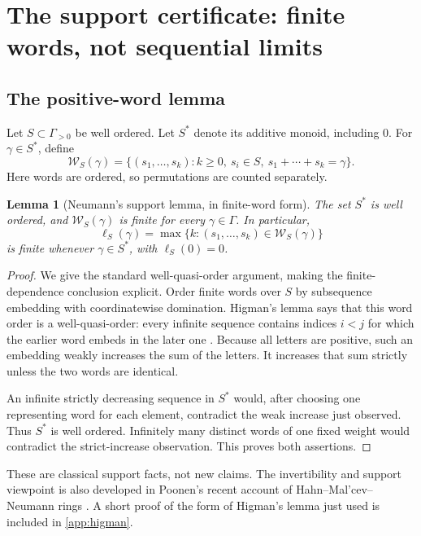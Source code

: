 \documentclass[11pt,letterpaper]{article}
\newtheorem{lemma}[lemma]{Lemma}
\theoremstyle{definition}
\theoremstyle{remark}
\newcommand{\word}{\mathcal W}
\numberwithin{equation}{section}
\begin{document}
\section{The support certificate: finite words, not sequential limits}
\label{sec:support}

\subsection{The positive-word lemma}
Let $S\subset\Gamma_{>0}$ be well ordered. Let $S^*$ denote its additive
monoid, including $0$. For $\gamma\in S^*$, define
\[
 \word_S(\gamma)=
 \{(s_1,\ldots,s_k): k\ge0,\ s_i\in S,\ s_1+\cdots+s_k=\gamma\}.
\]
Here words are ordered, so permutations are counted separately.

\begin{lemma}[Neumann's support lemma, in finite-word form]\label{lem:neumann}
The set $S^*$ is well ordered, and $\word_S(\gamma)$ is finite for every
$\gamma\in\Gamma$. In particular,
\begin{equation}\label{eq:depth}
 \ell_S(\gamma)=\max\{k:(s_1,\ldots,s_k)\in\word_S(\gamma)\}
\end{equation}
is finite whenever $\gamma\in S^*$, with $\ell_S(0)=0$.
\end{lemma}
\begin{proof}
We give the standard well-quasi-order argument, making the finite-dependence
conclusion explicit. Order finite words over $S$ by subsequence embedding
with coordinatewise domination. Higman's lemma says that this word order is
a well-quasi-order: every infinite sequence contains indices $i<j$ for which
the earlier word embeds in the later one \cite{Higman}. Because all letters
are positive, such an embedding weakly increases the sum of the letters.
It increases that sum strictly unless the two words are identical.

An infinite strictly decreasing sequence in $S^*$ would, after choosing one
representing word for each element, contradict the weak increase just
observed. Thus $S^*$ is well ordered. Infinitely many distinct words of one
fixed weight would contradict the strict-increase observation. This proves
both assertions.
\end{proof}
These are classical support facts, not new claims. The invertibility and
support viewpoint is also developed in Poonen's recent account of
Hahn--Mal'cev--Neumann rings \cite{Poonen}. A short proof of the form of
Higman's lemma just used is included in \cref{app:higman}.
\end{document}
